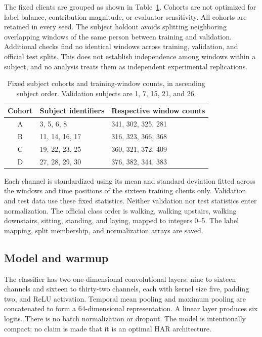 \documentclass[conference,letterpaper]{IEEEtran}
\begin{document}
The fixed clients are grouped as shown in Table~\ref{tab:cohorts}. Cohorts are not optimized for label balance, contribution magnitude, or evaluator sensitivity. All cohorts are retained in every seed. The subject holdout avoids splitting neighboring overlapping windows of the same person between training and validation. Additional checks find no identical windows across training, validation, and official test splits. This does not establish independence among windows within a subject, and no analysis treats them as independent experimental replications.

\begin{table}[t]
\caption{Fixed subject cohorts and training-window counts, in ascending subject order. Validation subjects are 1, 7, 15, 21, and 26.}
\label{tab:cohorts}\centering\small
\begin{tabular}{cll}\toprule
Cohort & Subject identifiers & Respective window counts\\\midrule
A & 3, 5, 6, 8 & 341, 302, 325, 281\\
B & 11, 14, 16, 17 & 316, 323, 366, 368\\
C & 19, 22, 23, 25 & 360, 321, 372, 409\\
D & 27, 28, 29, 30 & 376, 382, 344, 383\\\bottomrule
\end{tabular}
\end{table}

Each channel is standardized using its mean and standard deviation fitted across the windows and time positions of the sixteen training clients only. Validation and test data use these fixed statistics. Neither validation nor test statistics enter normalization. The official class order is walking, walking upstairs, walking downstairs, sitting, standing, and laying, mapped to integers 0--5. The label mapping, split membership, and normalization arrays are saved.

\subsection{Model and warmup}
The classifier has two one-dimensional convolutional layers: nine to sixteen channels and sixteen to thirty-two channels, each with kernel size five, padding two, and ReLU activation. Temporal mean pooling and maximum pooling are concatenated to form a 64-dimensional representation. A linear layer produces six logits. There is no batch normalization or dropout. The model is intentionally compact; no claim is made that it is an optimal HAR architecture.
\end{document}
